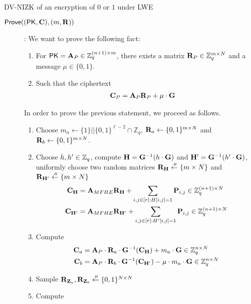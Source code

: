 \begin{subsection}{DV-NIZK of an encryption of $0$ or $1$ under LWE}
\begin{description}
    \item[${\mathsf{Prove}}((\mathsf{PK}, \mathbf{C}), (m, \mathbf{R}))$]:
      We want to prove the following fact:
      \begin{enumerate}
      \item For $\mathsf{PK} = \mathbf{A}_P \in \mathbb{Z}_q^{(n+1)\times m}$, there exists a matrix $\mathbf{R}_P \in \mathbb{Z}_q^{m \times N}$ and a message $\mu \in \{0,1\}$.
      \item Such that the ciphertext
      \begin{align*} 
      \mathbf{C}_P &= \mathbf{A}_P \mathbf{R}_P + \mu \cdot \mathbf{G}
      \end{align*}
      \end{enumerate}
      In order to prove the previous statement, we proceed as follows.
      \begin{enumerate}
      \item Choose $m_a \gets \{1\}||\{0,1\}^{\ell-2} \cap \mathbb{Z}_q$, $\mathbf{R}_a \gets \{0,1\}^{m \times N}$ and $\mathbf{R}_b \gets \{0,1\}^{m \times N}$.
      \item Choose $h, h\rq{} \in \mathbb{Z}_q$, compute $\mathbf{H} = \mathbf{G}^{-1}(h \cdot \mathbf{G})$ and $\mat{H}\rq{} = \mat{G}^{-1}(h\rq{} \cdot \mat{G})$, uniformly choose two random matrices $\mathbf{R}_{\mathbf{H}} \stackrel{{\scriptscriptstyle \mkern4mu R}}{\gets} \{m \times N\}$ and $\mat{R}_{\mat{H}\rq{}} \sample \{m \times N\}$
      \begin{align*}
       \mat{C}_{\mat{H}} &= \mat{A}_{MFHE} \mat{R}_{\mat{H}} + \sum_{i,j \in [r]: H[i,j] = 1} \mat{P}_{i,j} \in \mathbb{Z}_q^{(n+1) \times N}\\
       \mat{C}_{\mat{H}\rq{}} &= \mat{A}_{MFHE} \mat{R}_{\mat{H}\rq{}} + \sum_{i,j \in [r]: H\rq{}[i,j] = 1} \mat{P}_{i,j} \in \mathbb{Z}_q^{(n+1) \times N}
      \end{align*}
      \item Compute
        \begin{align*}
          \mat{C}_a &= \mat{A}_P \cdot \mat{R}_a \cdot \mat{G}^{-1}(\mat{C}_{\mat{H}}) + m_a \cdot \mat{G} \in \mathbb{Z}_q^{n \times N}\\
          \mat{C}_b &= \mat{A}_P \cdot \mat{R}_b \cdot \mat{G}^{-1}(\mat{C}_{\mat{H}\rq{}})- \mu \cdot m_a \cdot \mat{G} \in \mathbb{Z}_q^{n \times N}          
        \end{align*}
      \item Sample $\mathbf{R}_{\mathbf{Z}_a}, \mathbf{R}_{\mathbf{Z}_b}  \stackrel{{\scriptscriptstyle \mkern4mu R}}{\gets} \{0,1\}^{N\times N}$ 
      \item Compute
        \begin{align*}

\end{align*}
\end{enumerate}
\end{description}
\end{subsection}
